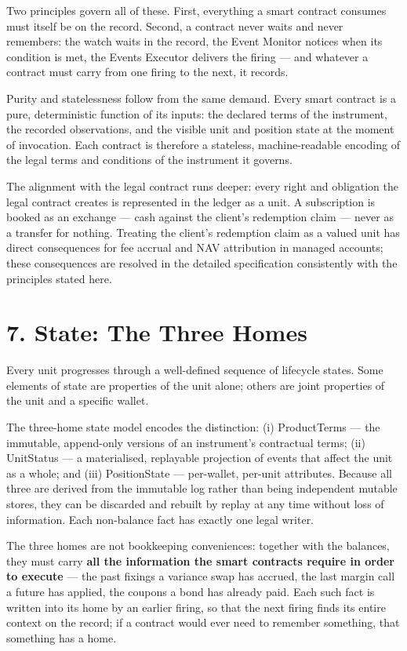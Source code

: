 \documentclass[11pt,a4paper]{article}
\begin{document}
Two principles govern all of these. First, everything a smart contract
consumes must itself be on the record. Second, a contract never waits
and never remembers: the watch waits in the record, the Event Monitor
notices when its condition is met, the Events Executor delivers the
firing --- and whatever a contract must carry from one firing to the
next, it records.

Purity and statelessness follow from the same demand. Every smart
contract is a pure, deterministic function of its inputs: the declared
terms of the instrument, the recorded observations, and the visible unit
and position state at the moment of invocation. Each contract is
therefore a stateless, machine-readable encoding of the legal terms and
conditions of the instrument it governs.

The alignment with the legal contract runs deeper: every right and
obligation the legal contract creates is represented in the ledger as a
unit. A subscription is booked as an exchange --- cash against the
client's redemption claim --- never as a transfer for nothing. Treating
the client's redemption claim as a valued unit has direct consequences
for fee accrual and NAV attribution in managed accounts; these
consequences are resolved in the detailed specification consistently
with the principles stated here.

\hypertarget{state-the-three-homes}{%
\section{7. State: The Three Homes}\label{state-the-three-homes}}

Every unit progresses through a well-defined sequence of lifecycle
states. Some elements of state are properties of the unit alone; others
are joint properties of the unit and a specific wallet.

The three-home state model encodes the distinction: (i) ProductTerms ---
the immutable, append-only versions of an instrument's contractual
terms; (ii) UnitStatus --- a materialised, replayable projection of
events that affect the unit as a whole; and (iii) PositionState ---
per-wallet, per-unit attributes. Because all three are derived from the
immutable log rather than being independent mutable stores, they can be
discarded and rebuilt by replay at any time without loss of information.
Each non-balance fact has exactly one legal writer.

The three homes are not bookkeeping conveniences: together with the
balances, they must carry \textbf{all the information the smart
contracts require in order to execute} --- the past fixings a variance
swap has accrued, the last margin call a future has applied, the coupons
a bond has already paid. Each such fact is written into its home by an
earlier firing, so that the next firing finds its entire context on the
record; if a contract would ever need to remember something, that
something has a home.
\end{document}
